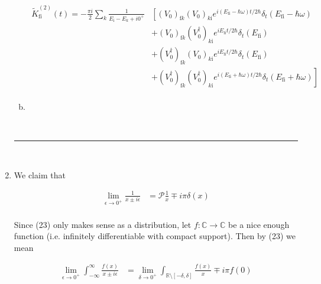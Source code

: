 \documentclass[]{article}
\begin{document}
\begin{enumerate}[1)]
\begin{enumerate}[a)]
\begin{equation}
\begin{split}
\tilde{K}^{(2)}_\text{fi} (t)  = - \frac{\pi i}{2 } \sum_k \frac{1}{E_\text{i} - E_k + i0^+} & \left[
 (V_0)_{\text{f} k }  (V_0)_{  k \text{i} } e^{ i ( E_{\text{fi}} - \hbar \omega ) t /2 \hbar } \delta_t ( E_\text{fi} - \hbar \omega  ) \right. \\
& \left. + (V_0)_{\text{f} k } (V_0^\dagger)_{  k \text{i}}  e^{ i  E_{\text{fi}} t /2 \hbar } \delta_t ( E_\text{fi}) 
 \right. \\
& \left.  +  (V_0^\dagger)_{\text{f} k }  (V_0)_{  k \text{i} } e^{ i  E_{\text{fi}} t /2 \hbar } \delta_t ( E_\text{fi}) 
\right. \\
& \left. +  (V_0^\dagger)_{\text{f} k }   (V_0^\dagger)_{  k \text{i}}   e^{ i ( E_{\text{fi}} + \hbar \omega ) t /2 \hbar } \delta_t ( E_\text{fi} + \hbar \omega  )
%
\right]
%
\\
\end{split}
\end{equation}


\item 






\end{enumerate}



\hfill \\
\noindent\rule{15cm}{0.4pt} \\


\item We claim that

\begin{equation}
\begin{split}
\lim_{\epsilon \to 0^+ } \frac{1}{ x \pm i\epsilon} & = \mathscr{P} \frac{1}{x} \mp i\pi \delta(x) \\
\end{split}
\end{equation}

Since (23) only makes sense as a distribution, let $f : \mathbb{C} \to \mathbb{C} $ be a nice enough function (i.e. infinitely differentiable with compact support). Then by (23) we mean

\begin{equation}
\begin{split}
\lim_{\epsilon \to 0^+ } \int_{-\infty}^{\infty}\frac{f(x)}{ x \pm i\epsilon} & = \lim_{\delta \to 0^+ } \int_{\mathbb{R} \setminus \left[- \delta, \delta \right] } \frac{f(x)}{x}   \mp i\pi f(0)  \\
\end{split}
\end{equation}


\end{enumerate}
\end{document}
